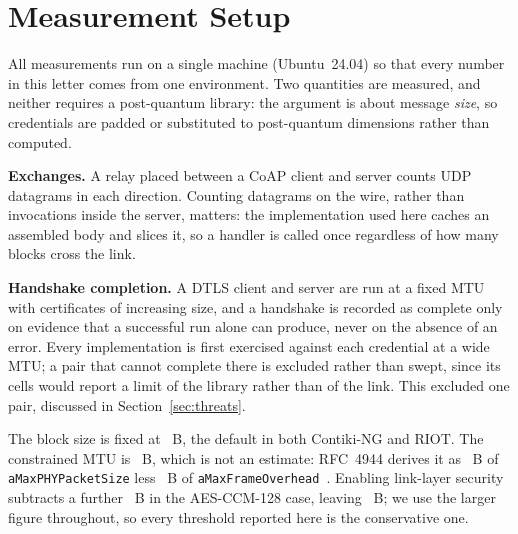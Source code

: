 %
%

\section{Measurement Setup}
\label{sec:setup}

All measurements run on a single machine (Ubuntu~24.04) so that every number in this letter
comes from one environment. Two quantities are measured, and neither requires a post-quantum
library: the argument is about message \emph{size}, so credentials are padded or substituted to
post-quantum dimensions rather than computed.

\textbf{Exchanges.} A relay placed between a CoAP client and server counts UDP datagrams in
each direction. Counting datagrams on the wire, rather than invocations inside the server,
matters: the implementation used here caches an assembled body and slices it, so a handler is
called once regardless of how many blocks cross the link.

\textbf{Handshake completion.} A DTLS client and server are run at a fixed MTU with
certificates of increasing size, and a handshake is recorded as complete only on evidence that
a successful run alone can produce, never on the absence of an error. Every implementation is
first exercised against each credential at a wide MTU; a pair that cannot complete there is
excluded rather than swept, since its cells would report a limit of the library rather than of
the link. This excluded one pair, discussed in Section~\ref{sec:threats}.

The block size is fixed at \numCoapBlock~B, the default in both Contiki-NG and RIOT. The
constrained MTU is \numFramePayload~B, which is not an estimate: RFC~4944 derives it as
\numFramePayloadFrame~B of \texttt{aMaxPHYPacketSize} less \numMacOverhead~B of
\texttt{aMaxFrameOverhead}~\cite{rfc4944}. Enabling link-layer security subtracts a further
\numLinkSec~B in the AES-CCM-128 case, leaving \numFramePayloadSecured~B; we use the larger
figure throughout, so every threshold reported here is the conservative one.

